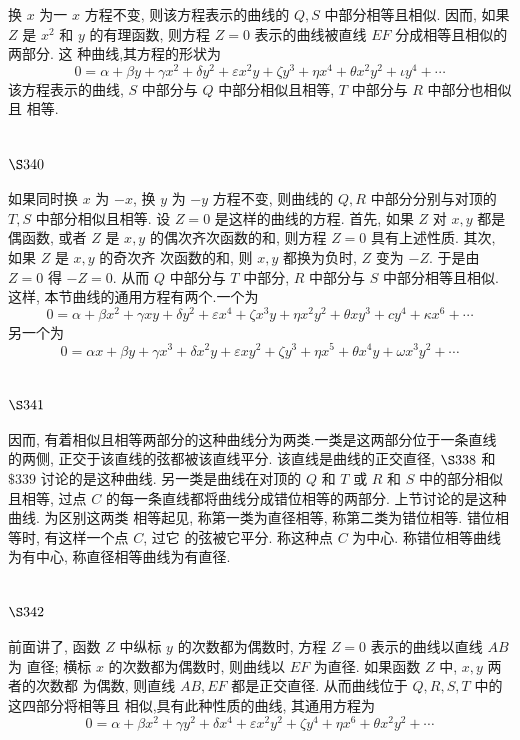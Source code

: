 换 $x$ 为一 $x$ 方程不变, 则该方程表示的曲线的 $Q, S$ 中部分相等且相似. 因而, 如果 $Z$ 是 $x^{2}$ 和 $y$ 的有理函数, 则方程 $Z=0$ 表示的曲线被直线 $E F$ 分成相等且相似的两部分. 这 种曲线,其方程的形状为
\[
0=\alpha+\beta y+\gamma x^{2}+\delta y^{2}+\varepsilon x^{2} y+\zeta y^{3}+\eta x^{4}+\theta x^{2} y^{2}+\iota y^{4}+\cdots
\]
该方程表示的曲线, $S$ 中部分与 $Q$ 中部分相似且相等, $T$ 中部分与 $R$ 中部分也相似且 相等.

\section{$\S 340$}

如果同时换 $x$ 为 $-x$, 换 $y$ 为 $-y$ 方程不变, 则曲线的 $Q, R$ 中部分分别与对顶的 $T, S$ 中部分相似且相等. 设 $Z=0$ 是这样的曲线的方程. 首先, 如果 $Z$ 对 $x, y$ 都是偶函数, 或者 $Z$ 是 $x, y$ 的偶次齐次函数的和, 则方程 $Z=0$ 具有上述性质. 其次, 如果 $Z$ 是 $x, y$ 的奇次齐 次函数的和, 则 $x, y$ 都换为负时, $Z$ 变为 $-Z$. 于是由 $Z=0$ 得 $-Z=0$. 从而 $Q$ 中部分与 $T$ 中部分, $R$ 中部分与 $S$ 中部分相等且相似. 这样, 本节曲线的通用方程有两个.一个为
\[
0=\alpha+\beta x^{2}+\gamma x y+\delta y^{2}+\varepsilon x^{4}+\zeta x^{3} y+\eta x^{2} y^{2}+\theta x y^{3}+c y^{4}+\kappa x^{6}+\cdots
\]
另一个为
\[
0=\alpha x+\beta y+\gamma x^{3}+\delta x^{2} y+\varepsilon x y^{2}+\zeta y^{3}+\eta x^{5}+\theta x^{4} y+\omega x^{3} y^{2}+\cdots
\]
\section{$\S 341$}

因而, 有着相似且相等两部分的这种曲线分为两类.一类是这两部分位于一条直线 的两侧, 正交于该直线的弦都被该直线平分. 该直线是曲线的正交直径, $\S 338$ 和 $\$ 339$ 讨论的是这种曲线. 另一类是曲线在对顶的 $Q$ 和 $T$ 或 $R$ 和 $S$ 中的部分相似且相等, 过点 $C$ 的每一条直线都将曲线分成错位相等的两部分. 上节讨论的是这种曲线. 为区别这两类 相等起见, 称第一类为直径相等, 称第二类为错位相等. 错位相等时, 有这样一个点 $C$, 过它 的弦被它平分. 称这种点 $C$ 为中心. 称错位相等曲线为有中心, 称直径相等曲线为有直径.

\section{$\S 342$}

前面讲了, 函数 $Z$ 中纵标 $y$ 的次数都为偶数时, 方程 $Z=0$ 表示的曲线以直线 $A B$ 为 直径; 横标 $x$ 的次数都为偶数时, 则曲线以 $E F$ 为直径. 如果函数 $Z$ 中, $x, y$ 两者的次数都 为偶数, 则直线 $A B, E F$ 都是正交直径. 从而曲线位于 $Q, R, S, T$ 中的这四部分将相等且 相似,具有此种性质的曲线, 其通用方程为
\[
0=\alpha+\beta x^{2}+\gamma y^{2}+\delta x^{4}+\varepsilon x^{2} y^{2}+\zeta y^{4}+\eta x^{6}+\theta x^{2} y^{2}+\cdots
\]

